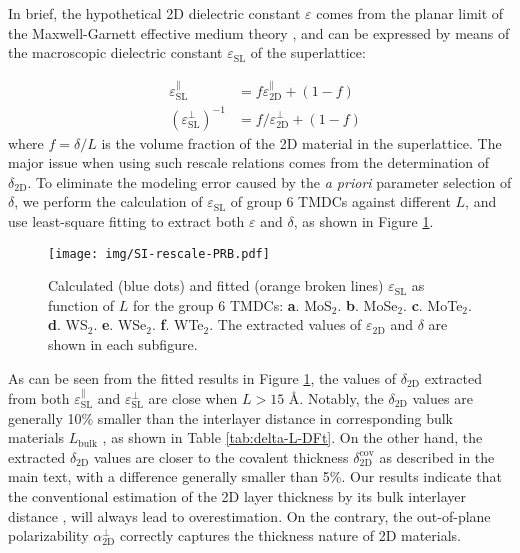 \documentclass[manuscript=suppinfo,email=true,hyperref=true,keywords=false]{achemso}
\begin{document}
In brief, the hypothetical 2D dielectric constant
$\varepsilon$ comes from the planar limit of the
Maxwell-Garnett effective medium theory \cite{Markel_2016}, and can be
expressed by means of the macroscopic dielectric constant
$\varepsilon_{\mathrm{SL}}$ of the superlattice:

\begin{eqnarray}
  \label{eq:MG-effect-1}
  &\varepsilon_{\mathrm{SL}}^{\parallel} &= f \varepsilon_{\mathrm{2D}}^{\parallel} + (1 - f)\\
  \label{eq:MG-effect-2}
  &(\varepsilon_{\mathrm{SL}}^{\perp})^{-1} &= f /\varepsilon_{\mathrm{2D}}^{\perp} + (1-f)
\end{eqnarray}
where $f=\delta/L$ is the volume fraction of the 2D
material in the superlattice. The major issue when using such rescale
relations comes from the determination of $\delta_{\mathrm{2D}}$. To
eliminate the modeling error caused by the \textit{a priori} parameter
selection of $\delta$, we perform the calculation of
$\varepsilon_{\mathrm{SL}}$ of group 6 TMDCs against different $L$,
and use least-square fitting to extract both
$\varepsilon$ and $\delta$, as shown in
Figure \ref{fig:rescale-prb}.

\begin{figure}[htbp]
  \centering
  \texttt{[image: img/SI-rescale-PRB.pdf]}
  \caption{ Calculated (blue dots) and fitted
    (orange broken lines) $\varepsilon_{\mathrm{SL}}$ as function of
    $L$ for the group 6 TMDCs:
    \textbf{a}. MoS$_{2}$. \textbf{b}. MoSe$_{2}$. \textbf{c}.
    MoTe$_{2}$. \textbf{d}. WS$_{2}$. \textbf{e}. WSe$_{2}$. \textbf{f}.
    WTe$_{2}$. The extracted values of $\varepsilon_{\mathrm{2D}}$ and
    $\delta$ are shown in each subfigure.}
  \label{fig:rescale-prb}
\end{figure}

As can be seen from the fitted results in Figure
\ref{fig:rescale-prb}, the values of $\delta_{\mathrm{2D}}$ extracted
from both $\varepsilon_{\mathrm{SL}}^{\parallel}$ and
$\varepsilon_{\mathrm{SL}}^{\perp}$ are close when $L> 15$
{\AA}. Notably, the $\delta_{\mathrm{2D}}$ values are generally 10\%
smaller than the interlayer distance in corresponding bulk materials
$L_{\mathrm{bulk}}$ , as shown in Table \ref{tab:delta-L-DFt}. On the
other hand, the extracted $\delta_{\mathrm{2D}}$ values are closer to
the covalent thickness $\delta_{\mathrm{2D}}^{\mathrm{cov}}$ as
described in the main text, with a difference generally smaller than
5\%. Our results indicate that the conventional estimation of the 2D
layer thickness by its bulk interlayer distance
\cite{Matthes_2016,Laturia_2018}, will always lead to
overestimation. On the contrary, the out-of-plane polarizability
$\alpha_{\mathrm{2D}}^{\perp}$ correctly captures the thickness nature
of 2D materials.
\end{document}
